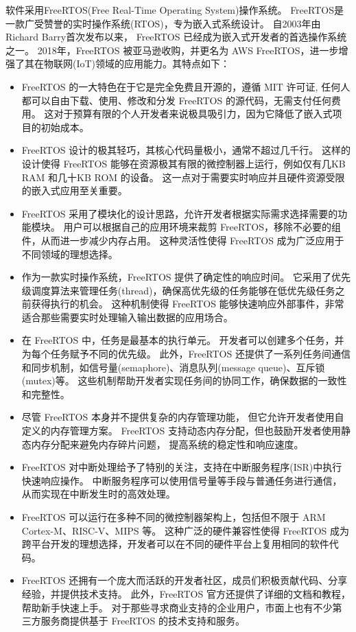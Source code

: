 软件采用FreeRTOS(Free Real-Time Operating System)操作系统。
FreeRTOS是一款广受赞誉的实时操作系统(RTOS)，专为嵌入式系统设计。
自2003年由Richard Barry首次发布以来，
FreeRTOS 已经成为嵌入式开发者的首选操作系统之一。
2018年，FreeRTOS 被亚马逊收购，并更名为 AWS FreeRTOS，进一步增强了其在物联网(IoT)领域的应用能力。其特点如下：
\begin{itemize}
    \item FreeRTOS 的一大特色在于它是完全免费且开源的，遵循 MIT 许可证,
    任何人都可以自由下载、使用、修改和分发 FreeRTOS 的源代码，无需支付任何费用。
    这对于预算有限的个人开发者来说极具吸引力，因为它降低了嵌入式项目的初始成本。
    \item FreeRTOS 设计的极其轻巧，其核心代码量极小，通常不超过几千行。
    这样的设计使得 FreeRTOS 能够在资源极其有限的微控制器上运行，例如仅有几KB RAM 和几十KB ROM 的设备。
    这一点对于需要实时响应并且硬件资源受限的嵌入式应用至关重要。 
    \item FreeRTOS 采用了模块化的设计思路，允许开发者根据实际需求选择需要的功能模块。
    用户可以根据自己的应用环境来裁剪 FreeRTOS，移除不必要的组件，从而进一步减少内存占用。
    这种灵活性使得 FreeRTOS 成为广泛应用于不同领域的理想选择。
    \item 作为一款实时操作系统，FreeRTOS 提供了确定性的响应时间。
    它采用了优先级调度算法来管理任务(thread)，确保高优先级的任务能够在低优先级任务之前获得执行的机会。
    这种机制使得 FreeRTOS 能够快速响应外部事件，非常适合那些需要实时处理输入输出数据的应用场合。
    \item 在 FreeRTOS 中，任务是最基本的执行单元。
    开发者可以创建多个任务，并为每个任务赋予不同的优先级。
    此外，FreeRTOS 还提供了一系列任务间通信和同步机制，如信号量(semaphore)、消息队列(message queue)、互斥锁(mutex)等。
    这些机制帮助开发者实现任务间的协同工作，确保数据的一致性和完整性。
    \item 尽管 FreeRTOS 本身并不提供复杂的内存管理功能，
    但它允许开发者使用自定义的内存管理方案。
    FreeRTOS 支持动态内存分配，但也鼓励开发者使用静态内存分配来避免内存碎片问题，
    提高系统的稳定性和响应速度。
    \item FreeRTOS 对中断处理给予了特别的关注，支持在中断服务程序(ISR)中执行快速响应操作。
    中断服务程序可以使用信号量等手段与普通任务进行通信，从而实现在中断发生时的高效处理。
    \item FreeRTOS 可以运行在多种不同的微控制器架构上，包括但不限于 ARM Cortex-M、RISC-V、MIPS 等。
    这种广泛的硬件兼容性使得 FreeRTOS 成为跨平台开发的理想选择，开发者可以在不同的硬件平台上复用相同的软件代码。
    \item FreeRTOS 还拥有一个庞大而活跃的开发者社区，成员们积极贡献代码、分享经验，并提供技术支持。
    此外，FreeRTOS 官方还提供了详细的文档和教程，帮助新手快速上手。
    对于那些寻求商业支持的企业用户，市面上也有不少第三方服务商提供基于 FreeRTOS 的技术支持和服务。
\end{itemize}


